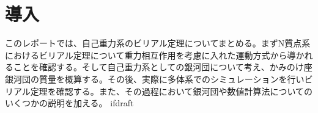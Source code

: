 \documentclass{jsarticle}
\begin{document}
\fi
\section  {導入}
このレポートでは、自己重力系のビリアル定理についてまとめる。まずN質点系におけるビリアル定理について重力相互作用を考慮に入れた運動方式から導かれることを確認する。そして自己重力系としての銀河団について考え、かみのけ座銀河団の質量を概算する。その後、実際に多体系でのシミュレーションを行いビリアル定理を確認する。また、その過程において銀河団や数値計算法についてのいくつかの説明を加える。
\expandafter\ifx\csname ifdraft\endcsname\relax
  
\end{document}
